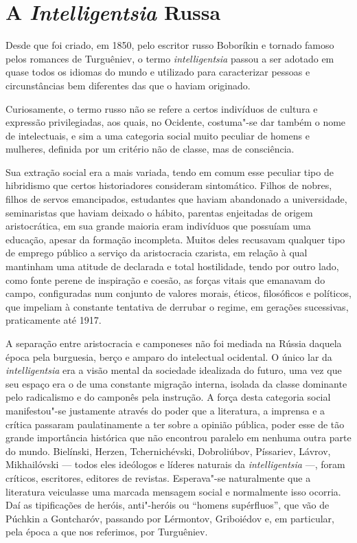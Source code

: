 \section{A \emph{Intelligentsia} Russa}

Desde que foi criado, em 1850, pelo escritor russo Boboríkin e tornado
famoso pelos romances de Turguêniev, o termo \emph{intelligentsia}
passou a ser adotado em quase todos os idiomas do mundo e utilizado para
caracterizar pessoas e circunstâncias bem diferentes das que o haviam
originado.

Curiosamente, o termo russo não se refere a certos indivíduos de cultura
e expressão privilegiadas, aos quais, no Ocidente, costuma"-se dar também
o nome de intelectuais, e sim a uma categoria social muito peculiar de
homens e mulheres, definida por um critério não de classe, mas de
consciência.

Sua extração social era a mais variada, tendo em comum esse peculiar
tipo de hibridismo que certos historiadores consideram sintomático.
Filhos de nobres, filhos de servos emancipados, estudantes que haviam
abandonado a universidade, seminaristas que haviam deixado o hábito,
parentas enjeitadas de origem aristocrática, em sua grande maioria eram
indivíduos que possuíam uma educação, apesar da formação incompleta.
Muitos deles recusavam qualquer tipo de emprego público a serviço da
aristocracia czarista, em relação à qual mantinham uma atitude de
declarada e total hostilidade, tendo por outro lado, como fonte perene
de inspiração e coesão, as forças vitais que emanavam do campo,
configuradas num conjunto de valores morais, éticos, filosóficos e
políticos, que impeliam à constante tentativa de derrubar o regime, em
gerações sucessivas, praticamente até 1917.

A separação entre aristocracia e camponeses não foi mediada na Rússia
daquela época pela burguesia, berço e amparo do intelectual ocidental. O
único lar da \emph{intelligentsia} era a visão mental da sociedade
idealizada do futuro, uma vez que seu espaço era o de uma constante
migração interna, isolada da classe dominante pelo radicalismo e do
camponês pela instrução. A força desta categoria social manifestou"-se
justamente através do poder que a literatura, a imprensa e a crítica
passaram paulatinamente a ter sobre a opinião pública, poder esse de tão
grande importância histórica que não encontrou paralelo em nenhuma
outra parte do mundo. Bielínski, Herzen, Tchernichévski, Dobroliúbov,
Píssariev, Lávrov, Mikhailóvski --- todos eles ideólogos e líderes
naturais da \emph{intelligentsia} ---, foram críticos, escritores,
editores de revistas. Esperava"-se naturalmente que a literatura
veiculasse uma marcada mensagem social e normalmente isso ocorria. Daí as
tipificações de heróis, anti"-heróis ou ``homens supérfluos'', que vão de
Púchkin a Gontcharóv, passando por Lérmontov, Griboiédov e, em
particular, pela época a que nos referimos, por Turguêniev.

